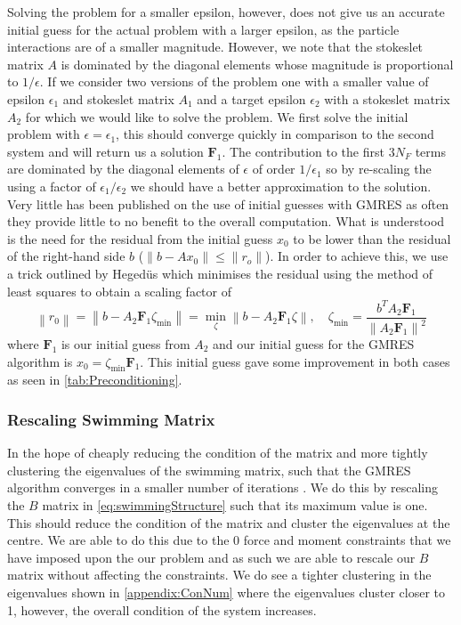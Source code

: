 Solving the problem for a smaller epsilon, however, does not give us an accurate initial guess for the actual problem with a larger epsilon, as the particle interactions are of a smaller magnitude. However, we note that the stokeslet matrix $A$ is dominated by the diagonal elements whose magnitude is proportional to $1/\epsilon$. If we consider two versions of the problem one with a smaller value of epsilon $\epsilon_1$ and stokeslet matrix $A_1$ and a target epsilon $\epsilon_2$ with a stokeslet matrix $A_2$ for which we would like to solve the problem. We first solve the initial problem with $\epsilon=\epsilon_1$, this should converge quickly in comparison to the second system and will return us a solution $\bm{F}_1$. The contribution to the first $3N_{F}$ terms are dominated by the diagonal elements of $\epsilon$ of order $1/\epsilon_1$ so by re-scaling the using a factor of $\epsilon_1/\epsilon_2$ we should have a better approximation to the solution. Very little has been published on the use of initial guesses with GMRES as often they provide little to no benefit to the overall computation. What is understood is the need for the residual from the initial guess $x_0$ to be lower than the residual of the right-hand side $b$ ($\lVert b-Ax_0 \rVert \leq \lVert r_o \rVert$). In order to achieve this, we use a trick outlined by Heged{\"u}s \cite{Saad1986GMRES:Systems,Strakos2005OnComputations} which minimises the residual using the method of least squares to obtain a scaling factor of 
\begin{equation*}
    \left\|r_{0}\right\|=\left\|b-A_2 \bm{F}_1 \zeta_{\min }\right\|=\min _{\zeta}\left\|b-A_2 \bm{F}_1 \zeta\right\|, \quad \zeta_{\min }=\frac{b^{T} A_2 \bm{F}_1}{\left\|A_2 \bm{F}_1\right\|^{2}}
    \label{eq:Hegedus}
\end{equation*}
where $\bm{F}_1$ is our initial guess from $A_2$ and our initial guess for the GMRES algorithm is $x_0 = \zeta_{\min} \bm{F}_1$. This initial guess gave some improvement in both cases as seen in \cref{tab:Preconditioning}.

\subsubsection{Rescaling Swimming Matrix} \label{sec:Rescale}
In the hope of cheaply reducing the condition of the matrix and more tightly clustering the eigenvalues of the swimming matrix, such that the GMRES algorithm converges in a smaller number of iterations \cite{CampbellGMRES}. We do this by rescaling the $B$ matrix in \cref{eq:swimmingStructure} such that its maximum value is one. This should reduce the condition of the matrix and cluster the eigenvalues at the centre. We are able to do this due to the $0$ force and moment constraints that we have imposed upon the our problem and as such we are able to rescale our $B$ matrix without affecting the constraints. 
We do see a tighter clustering in the eigenvalues shown in \cref{appendix:ConNum} where the eigenvalues cluster closer to 1, however, the overall condition of the system increases.


